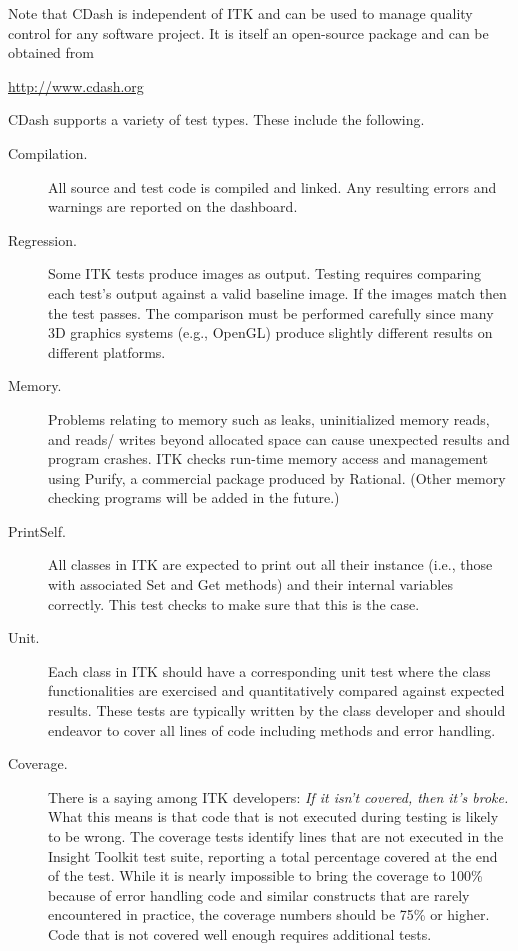 Note that CDash is independent of ITK and can be used to manage quality
control for any software project. It is itself an open-source package and can
be obtained from

\begin{center}
\url{http://www.cdash.org}
\end{center}

CDash supports a variety of test types. These include the following.
\begin{description}
        \item[Compilation.] All source and test code is compiled and linked.
        Any resulting errors and warnings are reported on the dashboard.

        \item[Regression.] Some ITK tests produce images as output. Testing
        requires comparing each test's output against a valid baseline image. If
        the images match then the test passes. The comparison must be
        performed carefully since many 3D graphics systems (e.g., OpenGL)
        produce slightly different results on different platforms.

        \item[Memory.] Problems relating to memory such as leaks, uninitialized
        memory reads, and reads/ writes beyond allocated space can cause
        unexpected results and program crashes. ITK checks run-time memory
        access and management using Purify, a commercial package produced by
        Rational. (Other memory checking programs will be added in the future.)

        \item[PrintSelf.] All classes in ITK are expected to print out all
        their instance (i.e., those with associated Set and Get
        methods) and their internal variables correctly. This test checks to
        make sure that this is the case.

        \item[Unit.] Each class in ITK should have a corresponding unit test
        where the class functionalities are exercised and quantitatively
        compared against expected results. These tests are typically written
        by the class developer and should endeavor to cover all lines of code
        including  methods and error handling.

       \item[Coverage.] There is a saying among ITK developers: \emph{If it
        isn't covered, then it's broke.} What this means is that
        code that is not executed during testing is likely to be wrong. The
        coverage tests identify lines that are not executed in the
        Insight Toolkit test suite, reporting a total percentage
        covered at the end of the test. While it is nearly impossible to
        bring the coverage to 100\% because of error handling code and similar
        constructs that are rarely encountered in practice, the coverage
        numbers should be 75\% or higher. Code that is not covered well enough
        requires additional tests.
\end{description}

